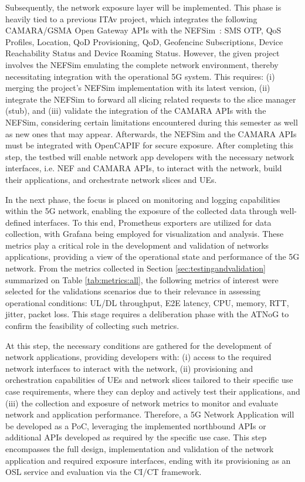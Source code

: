 Subsequently, the network exposure layer will be implemented. This phase is heavily tied to a previous \acs{ITAv} project, which integrates the following CAMARA/\acs{GSMA} Open Gateway \acsp{API} with the NEFSim~\cite{GSMANEFprojectIT}: \acs{SMS} \acs{OTP}, \acs{QoS} Profiles, Location, \acs{QoD} Provisioning, \acl{QoD}, Geofencinc Subscriptions, Device Reachability Status and Device Roaming Status. However, the given project involves the NEFSim emulating the complete network environment, thereby necessitating integration with the operational \acs{5G} system. This requires: (i) merging the project's NEFSim implementation with its latest version, (ii) integrate the NEFSim to forward all slicing related requests to the slice manager (stub), and (iii) validate the integration of the CAMARA \acsp{API} with the NEFSim, considering certain limitations encountered during this semester as well as new ones that may appear. Afterwards, the NEFSim and the CAMARA \acsp{API} must be integrated with OpenCAPIF for secure exposure. After completing this step, the testbed will enable network app developers with the necessary network interfaces, i.e. \acs{NEF} and CAMARA \acsp{API}, to interact with the network, build their applications, and orchestrate network slices and \acsp{UE}.

In the next phase, the focus is placed on monitoring and logging capabilities within the \acs{5G} network, enabling the exposure of the collected data through well-defined interfaces. To this end, Prometheus exporters are utilized for data collection, with Grafana being employed for visualization and analysis. These metrics play a critical role in the development and validation of networks applications, providing a view of the operational state and performance of the \acs{5G} network. From the metrics collected in Section \ref{sec:testingandvalidation} summarized on Table \ref{tab:metrics:all}, the following metrics of interest were selected for the validations scenarios due to their relevance in assessing operational conditions: \acs{UL}/\acs{DL} throughput, \acs{E2E} latency, \acs{CPU}, memory, \acs{RTT}, jitter, packet loss. This stage requires a deliberation phase with the \acf{ATNoG} to confirm the feasibility of collecting such  metrics.

At this step, the necessary conditions are gathered for the development of network applications, providing developers with: (i) access to the required network interfaces to interact with the network, (ii) provisioning and orchestration capabilities of \acsp{UE} and network slices tailored to their specific use case requirements, where they can deploy and actively test their applications, and (iii) the collection and exposure of network metrics to monitor and evaluate network and application performance. Therefore, a \acs{5G} Network Application will be developed as a \acs{PoC}, leveraging the implemented northbound \acsp{API} or additional \acsp{API} developed as required by the specific use case. This step encompasses the full design, implementation and validation of the network application and required exposure interfaces, ending with its provisioning as an \acs{OSL} service and evaluation via the \acs{CI}/\acs{CT} framework.



